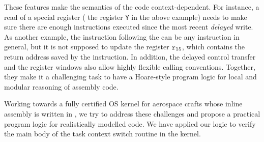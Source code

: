 These features make the semantics of the \sparc{} code
context-dependent. For instance, a read of a special register
(\eg{} the register {\tt Y} in the above example) needs to
make sure there are enough instructions executed since the
most recent {\em delayed} write. As another example,
the instruction following the \call{} can be any
instruction in general, but it is not supposed to
update the register $\texttt{r}_{15}$, which contains the return
address saved by the \call{} instruction.
In addition,
the delayed control transfer
and the register windows also allow highly flexible calling
conventions. Together, they make it a challenging task
to have a Hoare-style program logic for local and modular
reasoning of \sparc{} assembly code.

Working towards a fully certified OS kernel for aerospace
crafts whose inline assembly is written in \sparc,
we try to address these challenges and propose a practical
program logic for realistically modelled \sparc{} code.
We have applied our logic to verify the main body of
the task context switch routine in the kernel. 


